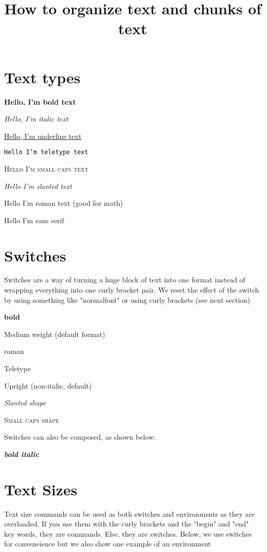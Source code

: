 \documentclass[12pt]{report}
\title{How to organize text and chunks of text}
\begin{document}
\maketitle

\section{Text types}
\textbf{Hello, I'm bold text}

\textit{Hello, I'm italic text}

\underline{Hello, I'm underline text}

\texttt{Hello I'm teletype text}

\textsc{Hello I'm small caps text}

\textsl{Hello I'm slanted text}

\textrm{Hello I'm roman text (good for math)}

\textsf{Hello I'm sans serif}

\section{Switches}
Switches are a way of turning a huge block of text into one format instead of wrapping everything into one curly bracket pair. We reset the effect of the switch by using something like "normalfont" or using curly brackets (see next section)

\bfseries
bold 
\normalfont 

\mdseries
Medium weight (default format)
\normalfont 

\rmfamily
roman
\normalfont 

\ttfamily 
Teletype 
\normalfont 

\upshape 
Upright (non-italic, default)
\normalfont 

\slshape 
Slanted shape 
\normalfont

\scshape
Small caps shape
\normalfont 

 Switches can also be composed, as shown below: 

\bfseries \slshape 
bold italic 
\normalfont 

\section{Text Sizes}
Text size commands can be used as both switches and environments as they are overloaded. If you use them with the curly brackets and the "begin" and "end" key words, they are commands. Else, they are switches. Below, we use switches for conveneience but we also show one example of an environment 
\end{document}
